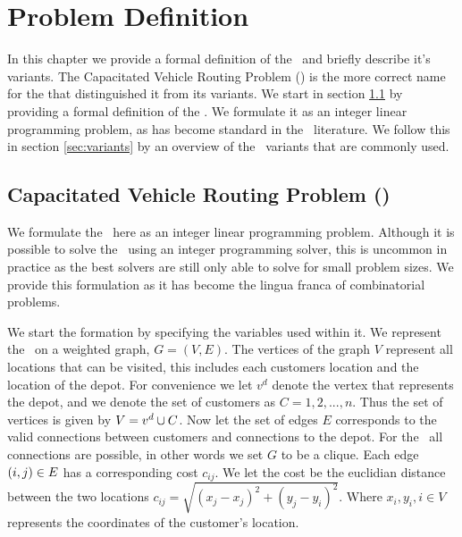 
\chapter{Problem Definition}
\label{chap:pd}

In this chapter we provide a formal definition of the \CVRP\ and briefly describe it's variants. The Capacitated Vehicle Routing Problem (\CVRP) is the more correct name for the \VRP that distinguished it from its variants. We start in section \ref{sec:capacitatedvehicleroutingproblem} by providing a formal definition of the \CVRP. We formulate it as an integer linear programming problem, as has become standard in the \VRP\ literature. We follow this in section \ref{sec:variants} by an overview of the \VRP\ variants that are commonly used.

\section{Capacitated Vehicle Routing Problem (\CVRP)}
\label{sec:capacitatedvehicleroutingproblem}

We formulate the \CVRP\ here as an integer linear programming problem. Although it is possible to solve the \VRP\ using an integer programming solver, this is uncommon in practice as the best solvers are still only able to solve for small problem sizes. We provide this formulation as it has become the lingua franca of combinatorial problems.

We start the formation by specifying the variables used within it. We represent the \CVRP\ on a weighted graph, $G = (V, E)$. The vertices of the graph $V$ represent all locations that can be visited, this includes each customers location and the location of the depot. For convenience we let $v^d$ denote the vertex that represents the depot, and we denote the set of customers as $C = 1,2,...,n$. Thus the set of vertices is given by $V = v^d \cup C$. Now let the set of edges $E$ corresponds to the valid connections between customers and connections to the depot. For the \CVRP\ all connections are possible, in other words we set $G$ to be a clique. Each edge $(i,j) \in E$ has a corresponding cost $c_{ij}$. We let the cost be the euclidian distance between the two locations $c_{ij} = \sqrt{(x_j - x_j)^2 + (y_j -  y_i)^2}$. Where $x_i, y_i, i \in V$ represents the coordinates of the customer's location. 

